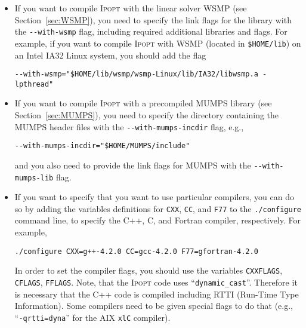 \documentclass[10pt]{article}
\newcommand{\Ipopt}{\textsc{Ipopt}\xspace}
\begin{document}
\begin{itemize}
  \verb|--with-pardiso="-qsmp=omp $HOME/lib/libpardiso_P4AIX51_64_P.so"|  %

  If you are using the parallel version of Pardiso, you need to
  specify the number of processors it should run on with the
  environment variable \verb|OMP_NUM_THREADS|, as described in the
  Pardiso manual.
  
  If you want to compile \Ipopt with the Pardiso library that is included
  in Intel MKL, it should be sufficient to ensure that MKL is used for
  the linear algebra routines (Blas/Lapack). On some systems, configure
  is able to find MKL automatically when looking for Blas. On other systems,
  one has to specify the MKL libraries with the \verb|--with-blas| option.

\item If you want to compile \Ipopt with the linear solver WSMP (see
  Section~\ref{sec:WSMP}), you need to specify the link flags for the
  library with the \verb|--with-wsmp| flag, including required
  additional libraries and flags.  For example, if you want to compile
  \Ipopt with WSMP (located in {\tt \$HOME/lib}) on an Intel IA32
  Linux system, you should add the flag

  \verb|--with-wsmp="$HOME/lib/wsmp/wsmp-Linux/lib/IA32/libwsmp.a -lpthread"| %

\item If you want to compile \Ipopt with a precompiled MUMPS library
  (see Section~\ref{sec:MUMPS}), you need to specify the directory containing
  the MUMPS header files with the \verb|--with-mumps-incdir| flag,
  e.g.,

  \verb|--with-mumps-incdir="$HOME/MUMPS/include"|  %

  and you also need to provide the link flags for MUMPS with the
  \verb|--with-mumps-lib| flag.

\item If you want to specify that you want to use particular
  compilers, you can do so by adding the variables definitions for
  {\tt CXX}, {\tt CC}, and {\tt F77} to the {\tt ./configure} command
  line, to specify the C++, C, and Fortran compiler, respectively.
  For example,

  {\tt ./configure CXX=g++-4.2.0 CC=gcc-4.2.0 F77=gfortran-4.2.0}

  In order to set the compiler flags, you should use the variables
  {\tt CXXFLAGS}, {\tt CFLAGS}, {\tt FFLAGS}.  Note, that the \Ipopt
  code uses ``{\tt dynamic\_cast}''.  Therefore it is necessary that
  the C++ code is compiled including RTTI (Run-Time Type Information).
  Some compilers need to be given special flags to do that (e.g.,
  ``{\tt -qrtti=dyna}'' for the AIX {\tt xlC} compiler).


\end{itemize}
\end{document}
